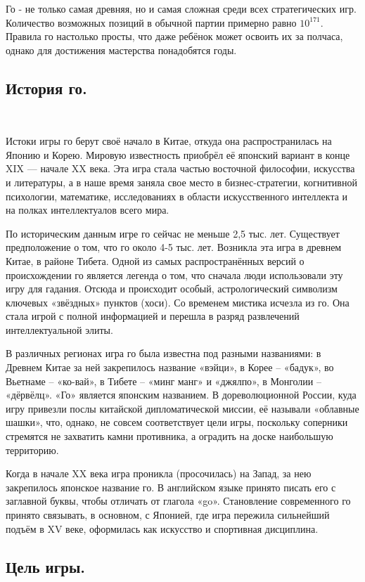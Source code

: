 \documentclass[14pt,a4paper]{extarticle}
\begin{document}
Го - не только самая древняя, но и самая сложная среди всех стратегических игр. Количество возможных позиций в обычной партии примерно равно $10^{171}$. Правила го настолько просты, что даже ребёнок может освоить их за полчаса, однако для достижения мастерства понадобятся годы. 

\subsection*{История го.}
\

Истоки игры го берут своё начало в Китае, откуда она распространилась на Японию и Корею. Мировую известность приобрёл её японский вариант в конце XIX — начале XX века. Эта игра стала частью восточной философии, искусства и литературы, а в наше время заняла свое место в бизнес-стратегии, когнитивной психологии, математике, исследованиях в области искусственного интеллекта и на полках интеллектуалов всего мира.

По историческим данным игре го сейчас не меньше 2,5 тыс. лет. Существует предположение о том, что го около 4-5 тыс. лет. Возникла эта игра в древнем Китае, в районе Тибета. Одной из самых распространённых версий о происхождении го является легенда о том, что сначала люди использовали эту игру для гадания. Отсюда и происходит особый, астрологический символизм ключевых «звёздных» пунктов (хоси). Со временем мистика исчезла из го. Она стала игрой с полной информацией и перешла в разряд развлечений интеллектуальной элиты.

В различных регионах игра го была известна под разными названиями: в Древнем Китае за ней закрепилось название «вэйци», в Корее – «бадук», во Вьетнаме – «ко-вай», в Тибете – «минг манг» и «джялпо», в Монголии – «дёрвёлц». «Го» является японским названием. В дореволюционной России, куда игру привезли послы китайской дипломатической миссии, её называли «облавные шашки», что, однако, не совсем соответствует цели игры, поскольку соперники стремятся не захватить камни противника, а оградить на доске наибольшую территорию. 

Когда в начале XX века игра проникла (просочилась) на Запад, за нею закрепилось японское название го. В английском языке принято писать его с заглавной буквы, чтобы отличать от глагола «go». Становление современного го принято связывать, в основном, с Японией, где игра пережила сильнейший подъём в XV веке, оформилась как искусство и спортивная дисциплина.

\subsection*{Цель игры.}
\ 
\end{document}
